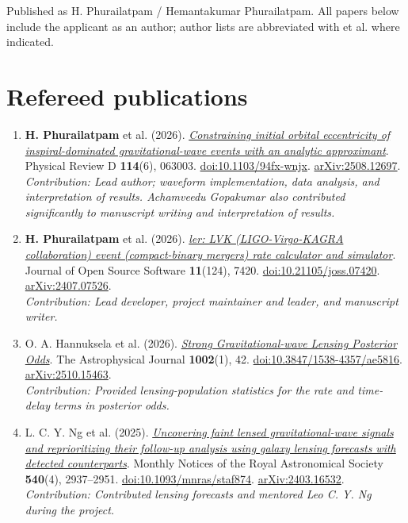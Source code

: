 \documentclass[11pt]{article}
\begin{document}
Published as H. Phurailatpam / Hemantakumar Phurailatpam. All papers below include the applicant as an author; author lists are abbreviated with et al. where indicated.
\section*{Refereed publications}
\begin{enumerate}
\item \textbf{H. Phurailatpam} et al. (2026). \href{https://doi.org/10.1103/94fx-wnjx}{\textit{Constraining initial orbital eccentricity of inspiral-dominated gravitational-wave events with an analytic approximant}}. Physical Review D \textbf{114}(6), 063003. \href{https://doi.org/10.1103/94fx-wnjx}{doi:10.1103/94fx-wnjx}. \href{https://arxiv.org/abs/2508.12697}{arXiv:2508.12697}.\\\emph{Contribution: Lead author; waveform implementation, data analysis, and interpretation of results. Achamveedu Gopakumar also contributed significantly to manuscript writing and interpretation of results.}
\item \textbf{H. Phurailatpam} et al. (2026). \href{https://doi.org/10.21105/joss.07420}{\textit{ler: LVK (LIGO-Virgo-KAGRA collaboration) event (compact-binary mergers) rate calculator and simulator}}. Journal of Open Source Software \textbf{11}(124), 7420. \href{https://doi.org/10.21105/joss.07420}{doi:10.21105/joss.07420}. \href{https://arxiv.org/abs/2407.07526}{arXiv:2407.07526}.\\\emph{Contribution: Lead developer, project maintainer and leader, and manuscript writer.}
\item O. A. Hannuksela et al. (2026). \href{https://doi.org/10.3847/1538-4357/ae5816}{\textit{Strong Gravitational-wave Lensing Posterior Odds}}. The Astrophysical Journal \textbf{1002}(1), 42. \href{https://doi.org/10.3847/1538-4357/ae5816}{doi:10.3847/1538-4357/ae5816}. \href{https://arxiv.org/abs/2510.15463}{arXiv:2510.15463}.\\\emph{Contribution: Provided lensing-population statistics for the rate and time-delay terms in posterior odds.}
\item L. C. Y. Ng et al. (2025). \href{https://doi.org/10.1093/mnras/staf874}{\textit{Uncovering faint lensed gravitational-wave signals and reprioritizing their follow-up analysis using galaxy lensing forecasts with detected counterparts}}. Monthly Notices of the Royal Astronomical Society \textbf{540}(4), 2937--2951. \href{https://doi.org/10.1093/mnras/staf874}{doi:10.1093/mnras/staf874}. \href{https://arxiv.org/abs/2403.16532}{arXiv:2403.16532}.\\\emph{Contribution: Contributed lensing forecasts and mentored Leo C. Y. Ng during the project.}

\end{enumerate}
\end{document}
